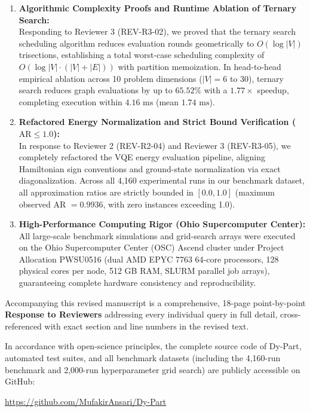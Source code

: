\documentclass[11pt,a4paper]{article}
\begin{document}
\begin{enumerate}[leftmargin=1.5em, itemsep=0.45em]
    \item \textbf{Algorithmic Complexity Proofs and Runtime Ablation of Ternary Search:}\\
    Responding to Reviewer 3 (REV-R3-02), we proved that the ternary search scheduling algorithm reduces evaluation rounds geometrically to $O(\log |V|)$ trisections, establishing a total worst-case scheduling complexity of $O(\log |V| \cdot (|V| + |E|))$ with partition memoization. In head-to-head empirical ablation across 10 problem dimensions ($|V|=6$ to $30$), ternary search reduces graph evaluations by up to $65.52\%$ with a $1.77\times$ speedup, completing execution within $4.16\text{ ms}$ (mean $1.74\text{ ms}$).

    \item \textbf{Refactored Energy Normalization and Strict Bound Verification ($\text{AR} \le 1.0$):}\\
    In response to Reviewer 2 (REV-R2-04) and Reviewer 3 (REV-R3-05), we completely refactored the VQE energy evaluation pipeline, aligning Hamiltonian sign conventions and ground-state normalization via exact diagonalization. Across all 4,160 experimental runs in our benchmark dataset, all approximation ratios are strictly bounded in $[0.0, 1.0]$ (maximum observed AR $= 0.9936$, with zero instances exceeding 1.0).

    \item \textbf{High-Performance Computing Rigor (Ohio Supercomputer Center):}\\
    All large-scale benchmark simulations and grid-search arrays were executed on the Ohio Supercomputer Center (OSC) Ascend cluster under Project Allocation PWSU0516 (dual AMD EPYC 7763 64-core processors, 128 physical cores per node, 512 GB RAM, SLURM parallel job arrays), guaranteeing complete hardware consistency and reproducibility.
\end{enumerate}

\vspace{0.6em}
\noindent
Accompanying this revised manuscript is a comprehensive, 18-page point-by-point \textbf{Response to Reviewers} addressing every individual query in full detail, cross-referenced with exact section and line numbers in the revised text.

\vspace{0.6em}
\noindent
In accordance with open-science principles, the complete source code of Dy-Part, automated test suites, and all benchmark datasets (including the 4,160-run benchmark and 2,000-run hyperparameter grid search) are publicly accessible on GitHub:
\begin{center}
    \url{https://github.com/MufakirAnsari/Dy-Part}
\end{center}
\end{document}
